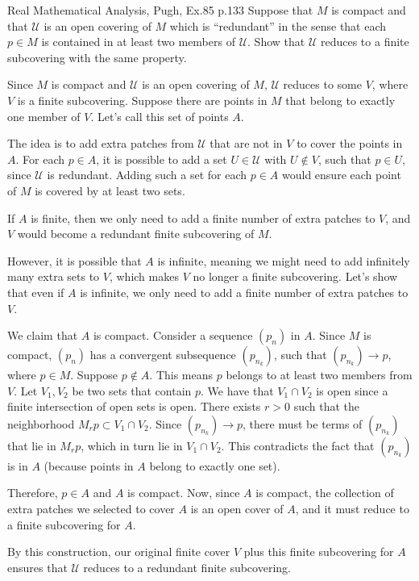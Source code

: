 \begin{problem}{}{}{Real Mathematical Analysis, Pugh, Ex.85 p.133}
Suppose that \(M\) is compact and that \(\mathcal{U}\) is an open covering of \(M\) which is
``redundant'' in the sense that each \(p \in M\) is contained in at least two members
of \(\mathcal{U}\). Show that \(\mathcal{U}\) reduces to a finite subcovering with the same property.
\end{problem}

\begin{solution}
Since $M$ is compact and $\mathcal{U}$ is an open covering of $M$, $\mathcal{U}$ reduces to some $V$, 
where $V$ is a finite subcovering.
Suppose there are points in $M$ that belong to exactly one member of $V$. Let's call this set of points $A$.

The idea is to add extra patches from $\mathcal{U}$ that are not in $V$ to cover the points in $A$. 
For each $p \in A$, it is possible to add a set $U \in \mathcal{U}$ with $U \notin V$, such that $p \in U$, 
since $\mathcal{U}$ is redundant. Adding such a set for each $p \in A$ would ensure each point of $M$ is covered by at least two sets.

If $A$ is finite, then we only need to add a finite number of extra patches to $V$, 
and $V$ would become a redundant finite subcovering of $M$.

However, it is possible that $A$ is infinite, meaning we might need to add infinitely many extra sets to $V$, 
which makes $V$ no longer a finite subcovering. Let's show that even if $A$ is infinite, we only need to add 
a finite number of extra patches to $V$.

We claim that $A$ is compact. Consider a sequence $(p_n)$ in $A$. Since $M$ is compact, 
$(p_n)$ has a convergent subsequence $(p_{n_k})$, such that $(p_{n_k}) \to p$, where $p \in M$. Suppose $p \notin A$. 
This means $p$ belongs to at least two members from $V$. Let $V_1, V_2$ be two sets that contain $p$. 
We have that $V_1 \cap V_2$ is open since a finite intersection of open sets is open. 
There exists $r > 0$ such that the neighborhood $M_{r}p  \subset V_1 \cap V_2$. Since $(p_{n_k}) \to p$, 
there must be terms of $(p_{n_k})$ that lie in $M_{r}p$, which in turn lie in $V_1 \cap V_2$. 
This contradicts the fact that $(p_{n_k})$ is in $A$ (because points in $A$ belong to exactly one set). 

Therefore, $p \in A$ and $A$ is compact. Now, since $A$ is compact, 
the collection of extra patches we selected to cover $A$ is an open cover of $A$, 
and it must reduce to a finite subcovering for $A$. 

By this construction, our original finite cover $V$ plus this finite subcovering for $A$ ensures 
that $\mathcal{U}$ reduces to a redundant finite subcovering.
\end{solution}